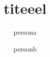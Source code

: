 \documentclass{article}
\begin{document}
\title{titeeel}

\author{persona \and personb }
\maketitle





\end{document}
